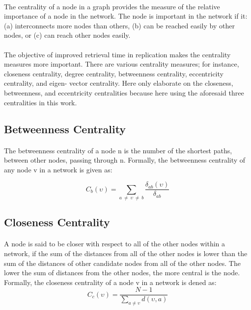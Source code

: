 \paragraph{}
The centrality of a node in a graph provides the measure of the relative importance
of a node in the network. The node is important in the network if it:
\newline (a) interconnects more nodes than others,
\newline (b) can be reached easily by other nodes, or 
\newline(c) can reach other nodes easily.
\paragraph{}
The objective of improved retrieval time in replication makes the centrality measures
more important. There are various centrality measures; for instance, closeness centrality,
degree centrality, betweenness centrality, eccentricity centrality, and eigen- vector centrality.
Here only elaborate on the closeness, betweenness, and eccentricity centralities because here
using the aforesaid three centralities in this work.
\subsection{Betweenness Centrality} 
\paragraph{}
The betweenness centrality of a node n is the number of the shortest paths, between
other nodes, passing through n. Formally, the betweenness centrality of any node v in a
network is given as:

\[
C_{b}(\upsilon) = \sum_{ a \ \neq \  \upsilon \ \neq \ b} \frac{\delta_{ab}(\upsilon)}{\delta_{ab}}
\] 

\subsection{Closeness Centrality}
\paragraph{}
A node is said to be closer with respect to all of the other nodes within a network, if
the sum of the distances from all of the other nodes is lower than the sum of the distances
of other candidate nodes from all of the other nodes. The lower the sum of distances from
the other nodes, the more central is the node. Formally, the closeness centrality of a node
v in a network is dened as:
\linebreak
\[
C_{c}(\upsilon) = \frac{N - 1}{ \sum _{ a \neq \upsilon} d(\upsilon, a)}
\]


